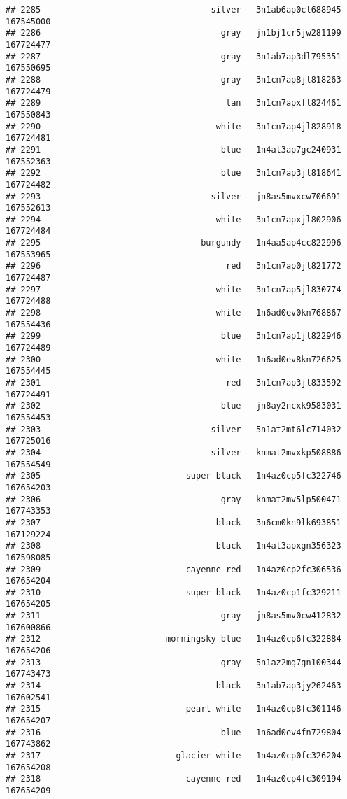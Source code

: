 \documentclass[
]{article}
\begin{document}
\begin{verbatim}
## 2285                                  silver   3n1ab6ap0cl688945 167545000
## 2286                                    gray   jn1bj1cr5jw281199 167724477
## 2287                                    gray   3n1ab7ap3dl795351 167550695
## 2288                                    gray   3n1cn7ap8jl818263 167724479
## 2289                                     tan   3n1cn7apxfl824461 167550843
## 2290                                   white   3n1cn7ap4jl828918 167724481
## 2291                                    blue   1n4al3ap7gc240931 167552363
## 2292                                    blue   3n1cn7ap3jl818641 167724482
## 2293                                  silver   jn8as5mvxcw706691 167552613
## 2294                                   white   3n1cn7apxjl802906 167724484
## 2295                                burgundy   1n4aa5ap4cc822996 167553965
## 2296                                     red   3n1cn7ap0jl821772 167724487
## 2297                                   white   3n1cn7ap5jl830774 167724488
## 2298                                   white   1n6ad0ev0kn768867 167554436
## 2299                                    blue   3n1cn7ap1jl822946 167724489
## 2300                                   white   1n6ad0ev8kn726625 167554445
## 2301                                     red   3n1cn7ap3jl833592 167724491
## 2302                                    blue   jn8ay2ncxk9583031 167554453
## 2303                                  silver   5n1at2mt6lc714032 167725016
## 2304                                  silver   knmat2mvxkp508886 167554549
## 2305                             super black   1n4az0cp5fc322746 167654203
## 2306                                    gray   knmat2mv5lp500471 167743353
## 2307                                   black   3n6cm0kn9lk693851 167129224
## 2308                                   black   1n4al3apxgn356323 167598085
## 2309                             cayenne red   1n4az0cp2fc306536 167654204
## 2310                             super black   1n4az0cp1fc329211 167654205
## 2311                                    gray   jn8as5mv0cw412832 167600866
## 2312                         morningsky blue   1n4az0cp6fc322884 167654206
## 2313                                    gray   5n1az2mg7gn100344 167743473
## 2314                                   black   3n1ab7ap3jy262463 167602541
## 2315                             pearl white   1n4az0cp8fc301146 167654207
## 2316                                    blue   1n6ad0ev4fn729804 167743862
## 2317                           glacier white   1n4az0cp0fc326204 167654208
## 2318                             cayenne red   1n4az0cp4fc309194 167654209

\end{verbatim}
\end{document}
